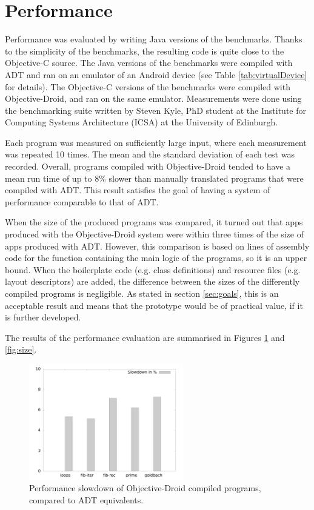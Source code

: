 \documentclass[parskip]{cs4rep}
\begin{document}
\section{Performance}

Performance was evaluated by writing Java versions of the benchmarks. Thanks to the simplicity of the benchmarks, the resulting code is quite close to the Objective-C source. The Java versions of the benchmarks were compiled with ADT and ran on an emulator of an Android device (see Table \ref{tab:virtualDevice} for details). The Objective-C versions of the benchmarks were compiled with Objective-Droid, and ran on the same emulator. Measurements were done using the benchmarking suite \cite{Kyle} written by Steven Kyle, PhD student at the Institute for Computing Systems Architecture (ICSA) at the University of Edinburgh.

Each program was measured on sufficiently large input, where each measurement was repeated 10 times. The mean and the standard deviation of each test was recorded. Overall, programs compiled with Objective-Droid tended to have a mean run time of up to 8\% slower than manually translated programs that were compiled with ADT. This result satisfies the goal of having a system of performance comparable to that of ADT.

When the size of the produced programs was compared, it turned out that apps produced with the Objective-Droid system were within three times of the size of apps produced with ADT. However, this comparison is based on lines of assembly code for the function containing the main logic of the programs, so it is an upper bound. When the boilerplate code (e.g. class definitions) and resource files (e.g. layout descriptors) are added, the difference between the sizes of the differently compiled programs is negligible. As stated in section \ref{sec:goals}, this is an acceptable result and means that the prototype would be of practical value, if it is further developed.

The results of the performance evaluation are summarised in Figures \ref{fig:speed} and \ref{fig:size}.

\begin{figure}[htb]
    \centering
        \includegraphics[width=0.6\textwidth]{speed}
    \caption{Performance slowdown of Objective-Droid compiled programs, compared to ADT equivalents.}
    \label{fig:speed}
\end{figure}
\end{document}
